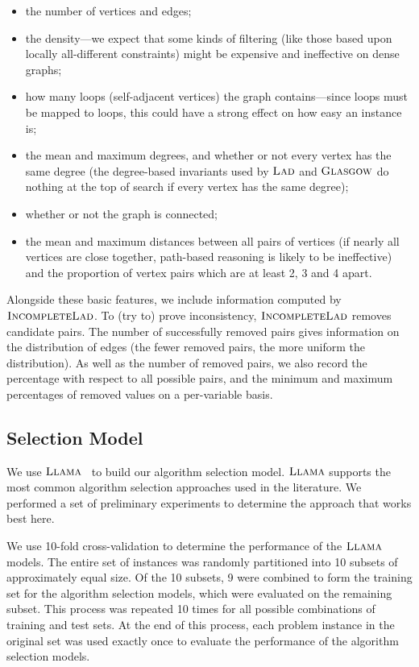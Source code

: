 \documentclass{llncs}
\newcommand{\Glasgow}{$\textsc{Glasgow}$\xspace}
\newcommand{\LAD}{$\textsc{Lad}$\xspace}
\newcommand{\IncompleteLAD}{$\textsc{IncompleteLad}$\xspace}
\newcommand{\LLAMA}{$\textsc{Llama}$\xspace}
\begin{document}
\begin{itemize}
    \item the number of vertices and edges;
    \item the density---we expect that some kinds of filtering (like those based upon locally
        all-different constraints) might be expensive and ineffective on
        dense graphs;
    \item how many loops (self-adjacent vertices) the graph contains---since loops must be mapped to
        loops, this could have a strong effect on how easy an instance is;
    \item the mean and maximum degrees, and whether or not every vertex has the same degree (the
        degree-based invariants used by \LAD and \Glasgow do nothing at the top of search if every
        vertex has the same degree);
    \item whether or not the graph is connected;
    \item the mean and maximum distances between all pairs of vertices (if nearly all vertices are
        close together, path-based reasoning is likely to be ineffective) and
        the proportion of vertex pairs which are at least 2, 3 and 4 apart.
\end{itemize}

\noindent Alongside these basic features, we include information computed by \IncompleteLAD. To (try to) prove
inconsistency, \IncompleteLAD removes candidate pairs. The number of successfully removed pairs
gives information on the distribution of edges (the fewer removed pairs, the more uniform the
distribution). As well as the number of removed pairs, we also record the percentage with respect to
all possible pairs, and the minimum and maximum percentages of removed values on
a per-variable basis.

\subsection{Selection Model}

We use \LLAMA~\cite{kotthoff_llama_2013} to build our algorithm selection model.
\LLAMA supports the most common algorithm selection approaches used in the literature. We performed a
set of preliminary experiments to determine the approach that works best here.

We use 10-fold cross-validation to determine the performance of the \LLAMA models. The entire set of
instances was randomly partitioned into 10 subsets of approximately equal size. Of the 10 subsets, 9
were combined to form the training set for the algorithm selection models, which were evaluated on
the remaining subset. This process was repeated 10 times for all possible combinations of training
and test sets. At the end of this process, each problem instance in the original set was used
exactly once to evaluate the performance of the algorithm selection models.
\end{document}

